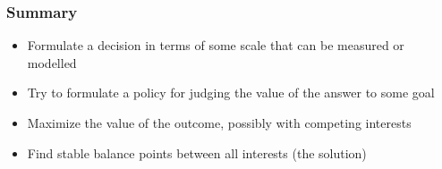 \documentclass{beamer}
\begin{document}
\begin{frame}
\frametitle{Summary}

\begin{itemize}
\item Formulate a decision in terms of some scale that can be measured or modelled\vspace{0.2cm}

\item Try to formulate a policy for judging the value of the answer to some goal\vspace{0.2cm}

\item Maximize the value of the outcome, possibly with competing interests\vspace{0.2cm}

\item Find stable balance points between all interests (the solution)
\end{itemize}
\end{frame}
\end{document}
